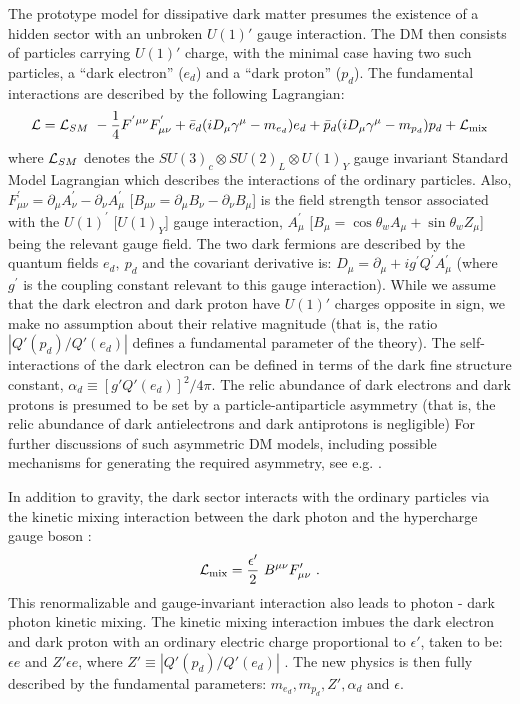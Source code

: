 \documentclass[12pt]{article}
\begin{document}
The prototype model for dissipative dark matter presumes the existence of a hidden sector with an unbroken $U(1)'$ gauge interaction. 
The DM then consists of particles carrying $U(1)'$ charge, with the minimal case having two such particles, a ``dark electron'' 
($e_d$) and a ``dark proton'' ($p_d$). The fundamental interactions are described by the following Lagrangian:
%
\begin{eqnarray}
{\cal L} = {\cal L}_{SM} \ - \frac{1}{4}F^{'\mu \nu} F _{\mu \nu}^{'} + \bar{e}_{d}(iD _{\mu}\gamma ^{\mu} - m_{e_d}) e_d 
+ \bar{p}_{d}(iD _{\mu}\gamma ^{\mu} - m _{p_d})p_d + {\cal L}_{\text{mix}} 
\end{eqnarray}
%
where ${\cal L}_{SM}$ denotes the $SU(3)_c \otimes SU(2)_L \otimes U(1)_Y$ gauge invariant Standard Model Lagrangian which describes 
the interactions of the ordinary particles. Also, $F_{\mu \nu}^{'} = \partial _{\mu} A _{\nu} ^{'} - \partial_{\nu} A _{\mu} ^{'}$ [$B_{\mu \nu}  
= \partial _{\mu} B _{\nu}  - \partial _{\nu} B _{\mu}$] is the field strength tensor associated with the $U(1) ^{'}$ [$U(1)_Y$] 
gauge interaction, $A _{\mu}^{'}$ [$B_{\mu} = \cos\theta_w A_\mu + \sin\theta_w Z_\mu$] being the relevant gauge field. The two dark fermions 
are described by the quantum fields $e_d, \ p_d$  and the covariant derivative is: 
$D_{\mu}  = \partial _{\mu} + ig^{'}Q^{'} A_{\mu}^{'}$ (where $g^{'}$ is the coupling constant relevant to this gauge interaction).
While we assume that the dark electron and dark proton have $U(1)'$ charges opposite in sign, 
we make no assumption about their relative magnitude (that is, the ratio $|Q'(p_d)/Q'(e_d)|$ defines a fundamental parameter of the theory).
The self-interactions of the dark electron can be defined in terms of the dark fine structure constant, $\alpha_d \equiv [g'Q'(e_d)]^2/4\pi$. 
The relic abundance of dark electrons and dark protons is presumed to be set by a particle-antiparticle asymmetry (that is, 
the relic abundance of dark antielectrons and dark antiprotons is negligible)
For further discussions of such asymmetric DM models, including possible mechanisms for generating the required asymmetry,
see e.g. \cite{reviewadm,zurekreview}.

In addition to gravity, the dark sector interacts with the ordinary particles via the kinetic mixing 
interaction between the dark photon and the hypercharge gauge boson \cite{he,flv}:
%
\begin{eqnarray}
{\cal L}_{\text{mix}} = \frac{\epsilon'}{2} \ B^{\mu \nu} F'_{\mu \nu}
\ .
\label{kine}
\end{eqnarray}
%
This renormalizable and gauge-invariant interaction also leads to photon - dark photon kinetic mixing. 
The kinetic mixing interaction imbues the dark electron and dark proton with an ordinary electric charge proportional 
to $\epsilon'$, taken to be: $\epsilon e$ and $Z' \epsilon e$, where $Z' \equiv |Q'(p_d)/Q'(e_d)|$ \cite{holdom}. 
The new physics is then fully described by the fundamental parameters: $m_{e_d}, m_{p_d}, Z', \alpha_d$ and $\epsilon$.
\end{document}
